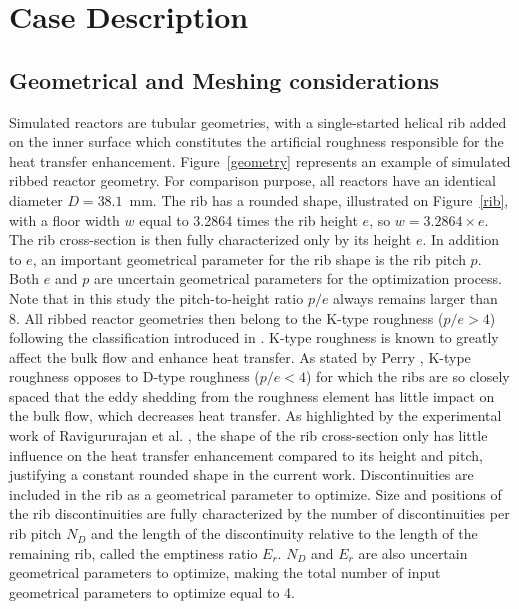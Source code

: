 \section{Case Description}
\label{sec:case}

\subsection{Geometrical and Meshing considerations}

Simulated reactors are tubular geometries, with a single-started helical rib added on the inner surface which constitutes the artificial roughness responsible for the heat transfer enhancement. Figure~\ref{geometry} represents an example of simulated ribbed reactor geometry. For comparison purpose, all reactors have an identical diameter $D=38.1$~mm. The rib has a rounded shape, illustrated on Figure~\ref{rib}, with a floor width $w$ equal to 3.2864 times the rib height $e$, so $w=3.2864 \times e$. The rib cross-section is then fully characterized only by its height $e$. In addition to $e$, an important geometrical parameter for the rib shape is the rib pitch $p$. Both $e$ and $p$ are uncertain geometrical parameters for the optimization process. Note that in this study the pitch-to-height ratio $p/e$ always remains larger than 8. All ribbed reactor geometries then belong to the K-type roughness ($p/e > 4$) following the classification introduced in \cite{jimenez2004, nagano2004}. K-type roughness is known to greatly affect the bulk flow and enhance heat transfer. As stated by Perry \cite{perry1969}, K-type roughness opposes to D-type roughness ($p/e < 4$) for which the ribs are so closely spaced that the eddy shedding from the roughness element has little impact on the bulk flow, which decreases heat transfer. As highlighted by the experimental work of Ravigururajan et al. \cite{ravigururajan1996}, the shape of the rib cross-section only has little influence on the heat transfer enhancement compared to its height and pitch, justifying a constant rounded shape in the current work. Discontinuities are included in the rib as a geometrical parameter to optimize. Size and positions of the rib discontinuities are fully characterized by the number of discontinuities per rib pitch $N_D$ and the length of the discontinuity relative to the length of the remaining rib, called the emptiness ratio $E_r$. $N_D$ and $E_r$ are also uncertain geometrical parameters to optimize, making the total number of input geometrical parameters to optimize equal to 4.\\

